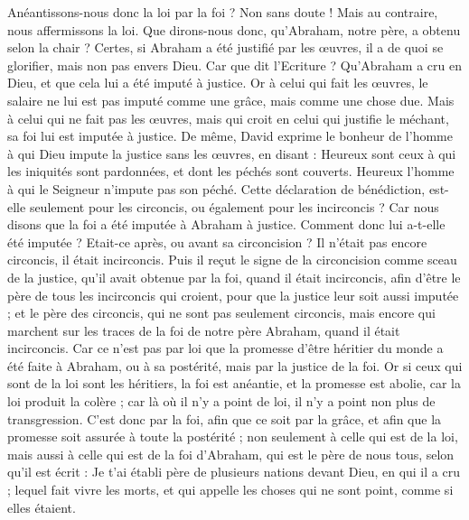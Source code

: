 \begin{multicols}{2}
Anéantissons-nous donc la loi par la foi ? Non sans doute ! Mais au contraire, nous affermissons la loi.
\VerseOne{}Que dirons-nous donc, qu'Abraham, notre père, a obtenu selon la chair ?
Certes, si Abraham a été justifié par les œuvres, il a de quoi se glorifier, mais non pas envers Dieu.
Car que dit l'Ecriture ? Qu'Abraham a cru en Dieu, et que cela lui a été imputé à justice.
Or à celui qui fait les œuvres, le salaire ne lui est pas imputé comme une grâce, mais comme une chose due.
Mais à celui qui ne fait pas les œuvres, mais qui croit en celui qui justifie le méchant, sa foi lui est imputée à justice.
De même, David exprime le bonheur de l'homme à qui Dieu impute la justice sans les œuvres, en disant :
Heureux sont ceux à qui les iniquités sont pardonnées, et dont les péchés sont couverts.
Heureux l'homme à qui le Seigneur n'impute pas son péché.
Cette déclaration de bénédiction, est-elle seulement pour les circoncis, ou également pour les incirconcis ? Car nous disons que la foi a été imputée à Abraham à justice.
Comment donc lui a-t-elle été imputée ? Etait-ce après, ou avant sa circoncision ? Il n'était pas encore circoncis, il était incirconcis.
Puis il reçut le signe de la circoncision comme sceau de la justice, qu'il avait obtenue par la foi, quand il était incirconcis, afin d'être le père de tous les incirconcis qui croient, pour que la justice leur soit aussi imputée ;
et le père des circoncis, qui ne sont pas seulement circoncis, mais encore qui marchent sur les traces de la foi de notre père Abraham, quand il était incirconcis.
Car ce n'est pas par loi que la promesse d'être héritier du monde a été faite à Abraham, ou à sa postérité, mais par la justice de la foi.
Or si ceux qui sont de la loi sont les héritiers, la foi est anéantie, et la promesse est abolie,
car la loi produit la colère ; car là où il n'y a point de loi, il n'y a point non plus de transgression.
C'est donc par la foi, afin que ce soit par la grâce, et afin que la promesse soit assurée à toute la postérité ; non seulement à celle qui est de la loi, mais aussi à celle qui est de la foi d'Abraham, qui est le père de nous tous,
selon qu'il est écrit : Je t'ai établi père de plusieurs nations devant Dieu, en qui il a cru ; lequel fait vivre les morts, et qui appelle les choses qui ne sont point, comme si elles étaient.

\end{multicols}
